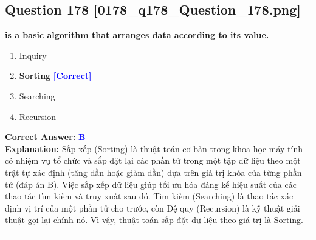 \documentclass[11pt,a4paper]{article}
\begin{document}
\begin{minipage}{\textwidth}
\subsection*{Question 178 \quad \footnotesize{[0178\_q178\_Question\_178.png]}}
\noindent \textbf{is a basic algorithm that arranges data according to its value.}

\begin{enumerate}[label=\Alph*.]
    \item Inquiry
    \item \textbf{Sorting} \hfill \textcolor{blue}{\textbf{[Correct]}}
    \item Searching
    \item Recursion
\end{enumerate}

\noindent \textbf{Correct Answer:} \textcolor{blue}{\textbf{B}} \\[2pt]
\noindent \textbf{Explanation:} Sắp xếp (Sorting) là thuật toán cơ bản trong khoa học máy tính có nhiệm vụ tổ chức và sắp đặt lại các phần tử trong một tập dữ liệu theo một trật tự xác định (tăng dần hoặc giảm dần) dựa trên giá trị khóa của từng phần tử (đáp án B). Việc sắp xếp dữ liệu giúp tối ưu hóa đáng kể hiệu suất của các thao tác tìm kiếm và truy xuất sau đó. Tìm kiếm (Searching) là thao tác xác định vị trí của một phần tử cho trước, còn Đệ quy (Recursion) là kỹ thuật giải thuật gọi lại chính nó. Vì vậy, thuật toán sắp đặt dữ liệu theo giá trị là Sorting.

\par\vspace{0.3cm}
\hrule
\vspace{0.3cm}
\end{minipage}
\end{document}
